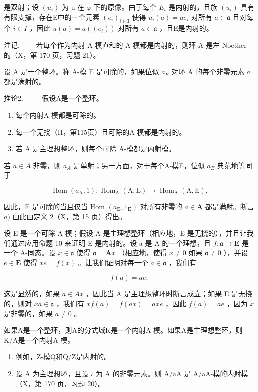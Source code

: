 是双射；设 \((u_{i})\) 为 u 在 \(\varphi\) 下的原像。由于每个 \(E_{i}\) 是内射的，且族 \((u_{i})\) 具有有限支撑，存在E中的一个元素 \((e_{i})_{i\in\mathbf{I}}\) 使得 \(u_{i}(a)=ae_{i}\) 对所有 \(a\in\mathfrak{a}\) 且对每个 \(i\in I\) ，因此 \(u(a)=a((e_{i}))\) 对所有 \(a\in\mathfrak{a}\) ，且E是内射的。

注记.—— 若每个作为内射 A-模直和的 A-模都是内射的，则环 A 是左 Noether 的（X，第 170 页，习题 21）。

设 A 是一个整环。称 A-模 E 是可除的，如果位似 \(a_{E}\) 对环 A 的每个非零元素 \(a\) 都是满射的。

推论2. —— 假设A是一个整环。

\begin{enumerate}
\def\labelenumi{\alph{enumi})}
\item
  每个内射A-模都是可除的。
\item
  每一个无挠（II，第115页）且可除的A-模都是内射的。
\item
  若 A 是主理想整环，则每个可除 A-模都是内射模。
\end{enumerate}

若 \(a \in A\) 非零，则 \(a_{A}\) 是单射；另一方面，对于每个A-模E，位似 \(a_{E}\) 典范地等同于

\[
\operatorname{Hom} \left(a _ {\mathrm{A}}, 1\right): \operatorname{Hom} _ {\mathrm{A}} (\mathrm{A}, \mathrm{E}) \rightarrow \operatorname{Hom} _ {\mathrm{A}} (\mathrm{A}, \mathrm{E}),
\]

因此，E 是可除的当且仅当 Hom \((a_{\mathbf{E}}, 1_{\mathbf{E}})\) 对所有非零的 \(a \in \mathbf{A}\) 都是满射。断言 \(a)\) 由此由定义 2（X，第 15 页）得出。

设 E 是一个可除 A-模；假设 A 是主理想整环（相应地，E 是无挠的），并且让我们通过应用命题 10 来证明 E 是内射的。设 a 是 A 的一个理想，且 \(f: \mathfrak{a} \to \mathbf{E}\) 是一个 A-同态。设 \(x \in \mathfrak{a}\) 使得 \(\mathfrak{a} = \mathbf{A}x\) （相应地，使得 \(x \neq 0\) 如果 \(\mathfrak{a} \neq 0\) ），并设 \(e \in \mathbf{E}\) 使得 \(xe = f(x)\) 。让我们证明对每一个 \(a \in \mathfrak{a}\) ，我们有

\[
f (a) = a e;
\]

这是显然的，如果 \(a \in Ax\) ，因此当 A 是主理想整环时断言成立；如果 E 是无挠的，则对 \(xa \in \mathfrak{a}\) ，我们有 \(xf(a) = f(ax) = axe\) ，因此 \(f(a) = ae\) ，因为 \(x\) 是非零的，如果 \(a \neq 0\) 。

如果A是一个整环，则A的分式域K是一个内射A-模。如果A是主理想整环，则K/A是一个内射A-模。

\begin{enumerate}
\def\labelenumi{\arabic{enumi})}
\setcounter{enumi}{1}
\item
  例如，Z-模Q和Q/Z是内射的。
\item
  设 A 为主理想环，且设 \(\iota\) 为 A 的非零元素。则 A/aA 是 A/aA-模的内射模（X，第 170 页，习题 20）。
\end{enumerate}

